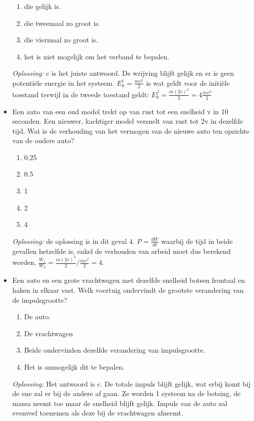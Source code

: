 \documentclass[12pt,a4paper]{article}
\begin{document}
\begin{itemize}
	\begin{enumerate}[label=\alph*]
		\item die gelijk is.
		\item die tweemaal zo groot is.
		\item die viermaal zo groot is.
		\item het is niet mogelijk om het verband te bepalen. 
	\end{enumerate}
	\textit{Oplossing:} c is het juiste antwoord. De wrijving blijft gelijk en er is geen potentiële energie in het systeem. \(E_k^i = \frac{mv^2}{2}\) is wat geldt voor de initiële toestand terwijl in de tweede toestand geldt: \(E_k^f = \frac{m(2v)^2}{2} = 4\frac{mv^2}{2}\)
	\newline
	\item Een auto van een oud model trekt op van rust tot een snelheid v in 10 seconden. Een nieuwer, kachtiger model versnelt van rust tot 2v in dezelfde tijd. Wat is de verhouding van het vermogen van de nieuwe auto ten opzichte van de oudere auto? 
	\begin{enumerate}[label=\alph*]
		\item 0.25
		\item 0.5
		\item 1
		\item 2
		\item 4
	\end{enumerate}
	\textit{Oplossing:} de oplossing is in dit geval 4. \(P = \frac{dW}{dt}\) waarbij de tijd in beide gevallen hetzelfde is, enkel de verhouden van arbeid moet dus berekend worden. \(\frac{W_1}{W_2} = \frac{m(2v)^2}{2} / \frac{mv^2}{2} = 4\).
	\newline 
	\item Een auto en een grote vrachtwagen met dezelfde snelheid botsen frontaal en haken in elkaar vast. Welk voertuig ondervindt de grootste verandering van de impulsgrootte?
	\begin{enumerate}[label=\alph*]
		\item De auto.
		\item De vrachtwagen
		\item Beide ondervinden dezelfde verandering van impulsgrootte.
		\item Het is onmogelijk dit te bepalen. 
	\end{enumerate}
	\textit{Oplossing:} Het antwoord is c. De totale impuls blijft gelijk, wat erbij komt bij de ene zal er bij de andere af gaan. Ze worden 1 systeem na de botsing, de massa neemt toe maar de snelheid blijft gelijk. Impuls van de auto zal evenveel toenemen als deze bij de vrachtwagen afneemt. 

\end{itemize}
\end{document}

